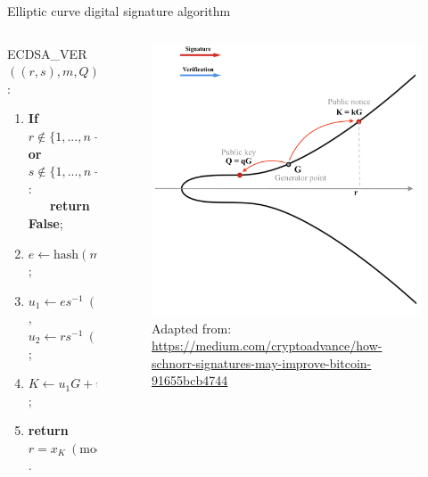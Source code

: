 \documentclass[slidescentered]{beamer}
\newcommand{\source}[1]{\caption*{\tiny Adapted from: {#1}} }
\begin{document}
	\begin{frame}{Elliptic curve digital signature algorithm}
		\begin{columns}
			\begin{column}{0.6\linewidth}
				ECDSA\_VER$((r,s), m, Q)$:
				\begin{enumerate}
					\item<2 -> \textbf{If} $r \notin \{1, ..., n - 1\}$ \textbf{or} $s \notin \{1, ..., n - 1\}$: \\ \textbf{\ \ \ return False};
					\item<3 -> $e \gets \text{hash}(m)$;
					\item<4 -> $u_1 \gets es^{-1} \ (\text{mod} \ n)$, $u_2 \gets rs^{-1} \ (\text{mod} \ n)$;
					\item<5 -> $K \gets u_1G + u_2Q$;
					\item<8 -> \textbf{return} $r = x_K \ (\text{mod} \ n)$.
				\end{enumerate}
			\end{column}
			\begin{column}{0.5\linewidth}
				\begin{figure}
					 {\vspace*{-0.5cm}
						\hspace*{-1cm}
						\includegraphics[scale=0.29]{images/ECDSA4}
						\source{\tiny \url{https://medium.com/cryptoadvance/how-schnorr-signatures-may-improve-bitcoin-91655bcb4744}}}

\end{figure}
\end{column}
\end{columns}
\end{frame}
\end{document}
